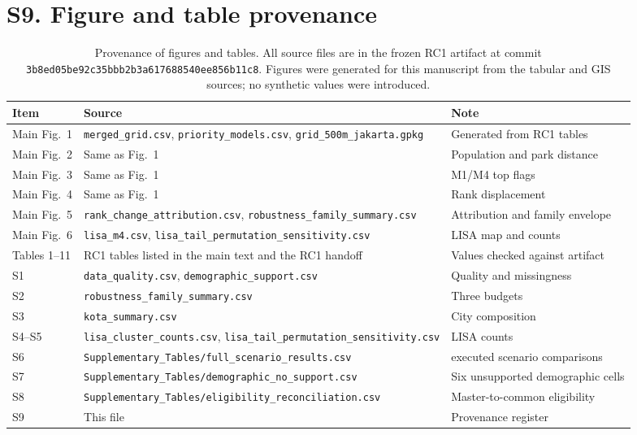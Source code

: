 \documentclass[times,twoside]{_Templates/MultiTargetManuscript}
\begin{document}
\section*{S9. Figure and table provenance}

\begin{table}[H]
\centering
\small
\caption{Provenance of figures and tables. All source files are in the frozen
RC1 artifact at commit \texttt{3b8ed05be92c35bbb2b3a617688540ee856b11c8}.
Figures were generated for this manuscript from the tabular and GIS sources; no
synthetic values were introduced.}
\label{tab:s10}
\begin{tabularx}{\textwidth}{@{}>{\raggedright\arraybackslash}p{3.3cm} >{\raggedright\arraybackslash}X >{\raggedright\arraybackslash}p{4.0cm}@{}}
\toprule
Item & Source & Note \\
\midrule
Main Fig.~1 & \texttt{merged\_grid.csv}, \texttt{priority\_models.csv}, \texttt{grid\_500m\_jakarta.gpkg} & Generated from RC1 tables \\
Main Fig.~2 & Same as Fig.~1 & Population and park distance \\
Main Fig.~3 & Same as Fig.~1 & M1/M4 top flags \\
Main Fig.~4 & Same as Fig.~1 & Rank displacement \\
Main Fig.~5 & \texttt{rank\_change\_attribution.csv}, \texttt{robustness\_family\_summary.csv} & Attribution and family envelope \\
Main Fig.~6 & \texttt{lisa\_m4.csv}, \texttt{lisa\_tail\_permutation\_sensitivity.csv} & LISA map and counts \\
Tables 1--11 & RC1 tables listed in the main text and the RC1 handoff & Values checked against artifact \\
S1 & \texttt{data\_quality.csv}, \texttt{demographic\_support.csv} & Quality and missingness \\
S2 & \texttt{robustness\_family\_summary.csv} & Three budgets \\
S3 & \texttt{kota\_summary.csv} & City composition \\
S4--S5 & \texttt{lisa\_cluster\_counts.csv}, \texttt{lisa\_tail\_permutation\_sensitivity.csv} & LISA counts \\
S6 & \texttt{Supplementary\_Tables/full\_scenario\_results.csv} & 49 executed scenario comparisons \\
S7 & \texttt{Supplementary\_Tables/demographic\_no\_support.csv} & Six unsupported demographic cells \\
S8 & \texttt{Supplementary\_Tables/eligibility\_reconciliation.csv} & Master-to-common eligibility \\
S9 & This file & Provenance register \\
\bottomrule
\end{tabularx}
\end{table}
\end{document}

